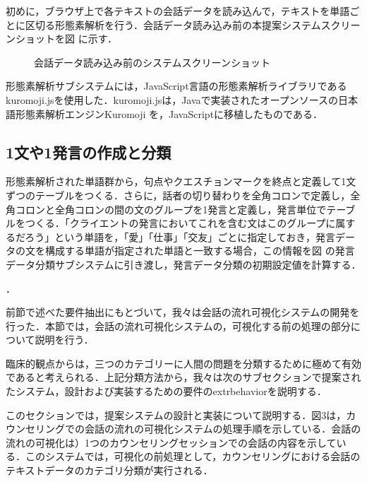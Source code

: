 \documentclass[shuuron]{kuee}
\begin{document}
初めに，ブラウザ上で各テキストの会話データを読み込んで，テキストを単語ごとに区切る形態素解析を行う．会話データ読み込み前の本提案システムスクリーンショットを図
に示す．
 \begin{figure}
   \begin{center}
   \end{center}
   \caption{会話データ読み込み前のシステムスクリーンショット}
   \label{fig:yomikomimae2}
 \end{figure}
形態素解析サブシステムには，JavaScript言語の形態素解析ライブラリであるkuromoji.js\cite{kuromojijs}を使用した．kuromoji.jsは，Javaで実装されたオープンソースの日本語形態素解析エンジンKuromoji
を，JavaScriptに移植したものである．

\subsection{1文や1発言の作成と分類}%
形態素解析された単語群から，句点やクエスチョンマークを終点と定義して1文ずつのテーブルをつくる．さらに，話者の切り替わりを全角コロンで定義し，全角コロンと全角コロンの間の文のグループを1発言と定義し，発言単位でテーブルをつくる．「クライエントの発言においてこれを含む文はこのグループに属するだろう」という単語を，「愛」「仕事」「交友」ごとに指定しておき，発言データの文を構成する単語が指定された単語と一致する場合，この情報を図
の発言データ分類サブシステムに引き渡し，発言データ分類の初期設定値を計算する．



．






前節で述べた要件抽出にもとづいて，我々は会話の流れ可視化システムの開発を行った．本節では，会話の流れ可視化システムの，可視化する前の処理の部分について説明を行う．



  臨床的観点からは，三つのカテゴリーに人間の問題を分類するために極めて有効であると考えられる．上記分類方法から，我々は次のサブセクションで提案されたシステム，設計および実装するための要件のextrbehaviorを説明する．


  このセクションでは，提案システムの設計と実装について説明する．図3は，カウンセリングでの会話の流れの可視化システムの処理手順を示している．会話の流れの可視化は）1つのカウンセリングセッションでの会話の内容を示している．このシステムでは，可視化の前処理として，カウンセリングにおける会話のテキストデータのカテゴリ分類が実行される．
\end{document}
